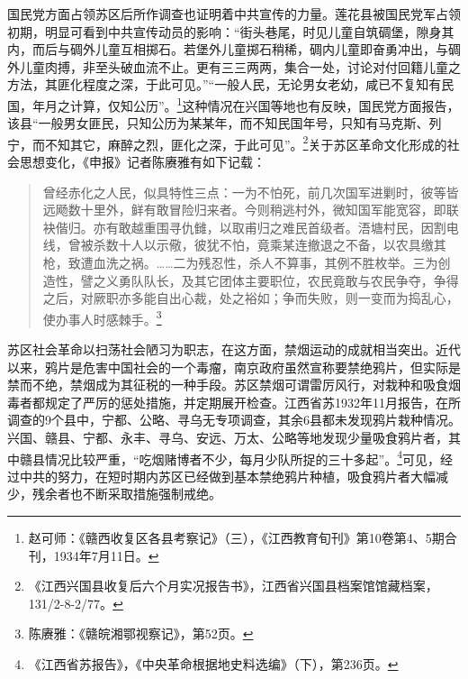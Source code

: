 国民党方面占领苏区后所作调查也证明着中共宣传的力量。莲花县被国民党军占领初期，明显可看到中共宣传动员的影响：“街头巷尾，时见儿童自筑碉堡，隙身其内，而后与碉外儿童互相掷石。若堡外儿童掷石稍稀，碉内儿童即奋勇冲出，与碉外儿童肉搏，非至头破血流不止。更有三三两两，集合一处，讨论对付回籍儿童之方法，其匪化程度之深，于此可见。”“一般人民，无论男女老幼，咸已不复知有民国，年月之计算，仅知公历”。\footnote{赵可师：《赣西收复区各县考察记》（三），《江西教育旬刊》第10卷第4、5期合刊，1934年7月11日。}这种情况在兴国等地也有反映，国民党方面报告，该县“一般男女匪民，只知公历为某某年，而不知民国年号，只知有马克斯、列宁，而不知其它，麻醉之烈，匪化之深，于此可见”。\footnote{《江西兴国县收复后六个月实况报告书》，江西省兴国县档案馆馆藏档案，131/2-8-2/77。}关于苏区革命文化形成的社会思想变化，《申报》记者陈赓雅有如下记载：

\begin{quote}

曾经赤化之人民，似具特性三点：一为不怕死，前几次国军进剿时，彼等皆远飏数十里外，鲜有敢冒险归来者。今则稍逃村外，微知国军能宽容，即联袂偕归。亦有敢越重围寻仇雠，以取甫归之难民首级者。浯塘村民，因割电线，曾被杀数十人以示儆，彼犹不怕，竟乘某连撤退之不备，以农具缴其枪，致遭血洗之祸。……二为残忍性，杀人不算事，其例不胜枚举。三为创造性，譬之义勇队队长，及其它团体主要职位，农民竟敢与农民争夺，争得之后，对厥职亦多能自出心裁，处之裕如；争而失败，则一变而为捣乱心，使办事人时感棘手。\footnote{陈赓雅：《赣皖湘鄂视察记》，第52页。}
\end{quote}


苏区社会革命以扫荡社会陋习为职志，在这方面，禁烟运动的成就相当突出。近代以来，鸦片是危害中国社会的一个毒瘤，南京政府虽然宣称要禁绝鸦片，但实际是禁而不绝，禁烟成为其征税的一种手段。苏区禁烟可谓雷厉风行，对栽种和吸食烟毒者都规定了严厉的惩处措施，并定期展开检查。江西省苏1932年11月报告，在所调查的9个县中，宁都、公略、寻乌无专项调查，其余6县都未发现鸦片栽种情况。兴国、赣县、宁都、永丰、寻乌、安远、万太、公略等地发现少量吸食鸦片者，其中赣县情况比较严重，“吃烟赌博者不少，每月少队所捉的三十多起”。\footnote{《江西省苏报告》，《中央革命根据地史料选编》（下），第236页。}可见，经过中共的努力，在短时期内苏区已经做到基本禁绝鸦片种植，吸食鸦片者大幅减少，残余者也不断采取措施强制戒绝。


